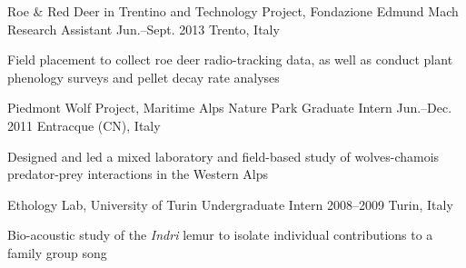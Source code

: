 \begin{cventries}
  \cventry
    {Roe \& Red Deer in Trentino and Technology Project, Fondazione Edmund Mach} %
    {Research Assistant} %
    {Jun.--Sept. 2013} %
    {Trento, Italy} %
    {
      \begin{cvitems} %
        \item {Field placement to collect roe deer radio-tracking data, as well as conduct plant phenology surveys and pellet decay rate analyses}
      \end{cvitems}   
    }

  \cventry
    {Piedmont Wolf Project, Maritime Alps Nature Park} %
    {Graduate Intern} %
    {Jun.--Dec. 2011} %
    {Entracque (CN), Italy} %
    {
      \begin{cvitems} %
        \item {Designed and led a mixed laboratory and field-based study of wolves-chamois predator-prey interactions in the Western Alps}
      \end{cvitems} 
    }

  \cventry
    {Ethology Lab, University of Turin} %
    {Undergraduate Intern} %
    {2008--2009} %
    {Turin, Italy} %
    {
       \begin{cvitems} %
        \item {Bio-acoustic study of the \textit{Indri} lemur to isolate individual contributions to a family group song}
      \end{cvitems} 
    }

\end{cventries}
